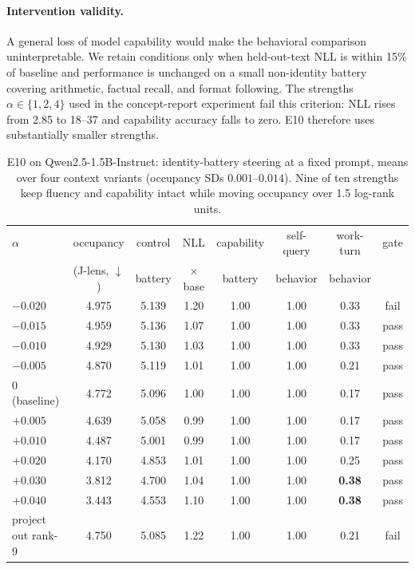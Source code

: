 \documentclass[11pt]{article}
\newcommand{\jlens}{J\mbox{-}lens}
\begin{document}
\paragraph{Intervention validity.} A general loss of model capability would make the behavioral comparison uninterpretable. We retain conditions only when held-out-text NLL is within 15\% of baseline and performance is unchanged on a small non-identity battery covering arithmetic, factual recall, and format following. The strengths $\alpha\in\{1,2,4\}$ used in the concept-report experiment fail this criterion: NLL rises from 2.85 to 18--37 and capability accuracy falls to zero. E10 therefore uses substantially smaller strengths.

\begin{table}[h]
\centering\small
\begin{tabular}{lccccccc}
\toprule
$\alpha$ & occupancy & control & NLL & capability & self-query & work-turn & gate \\
 & (\jlens{}, $\downarrow$) & battery & $\times$base & battery & behavior & behavior & \\
\midrule
$-0.020$ & 4.975 & 5.139 & 1.20 & 1.00 & 1.00 & 0.33 & fail \\
$-0.015$ & 4.959 & 5.136 & 1.07 & 1.00 & 1.00 & 0.33 & pass \\
$-0.010$ & 4.929 & 5.130 & 1.03 & 1.00 & 1.00 & 0.33 & pass \\
$-0.005$ & 4.870 & 5.119 & 1.01 & 1.00 & 1.00 & 0.21 & pass \\
$0$ (baseline) & 4.772 & 5.096 & 1.00 & 1.00 & 1.00 & 0.17 & pass \\
$+0.005$ & 4.639 & 5.058 & 0.99 & 1.00 & 1.00 & 0.17 & pass \\
$+0.010$ & 4.487 & 5.001 & 0.99 & 1.00 & 1.00 & 0.17 & pass \\
$+0.020$ & 4.170 & 4.853 & 1.01 & 1.00 & 1.00 & 0.25 & pass \\
$+0.030$ & 3.812 & 4.700 & 1.04 & 1.00 & 1.00 & \textbf{0.38} & pass \\
$+0.040$ & 3.443 & 4.553 & 1.10 & 1.00 & 1.00 & \textbf{0.38} & pass \\
\midrule
project out rank-9 & 4.750 & 5.085 & 1.22 & 1.00 & 1.00 & 0.21 & fail \\
\bottomrule
\end{tabular}
\caption{E10 on Qwen2.5-1.5B-Instruct: identity-battery steering at a fixed prompt, means over four context variants (occupancy SDs $0.001$--$0.014$). Nine of ten strengths keep fluency and capability intact while moving occupancy over 1.5 log-rank units.}
\label{tab:e10}
\end{table}
\end{document}
